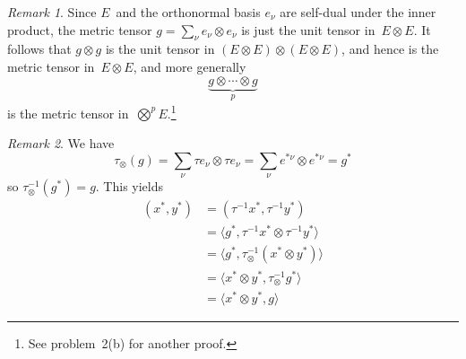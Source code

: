 \documentclass[letterpaper,12pt]{article}
\newcommand{\tprod}{\otimes}
\newcommand{\bigtprod}{\bigotimes}
\newcommand{\medtprod}{{\textstyle\bigtprod}}
\newcommand{\sprod}[2]{\langle#1,#2\rangle}
\newcommand{\iprod}[2]{(#1,#2)}
\theoremstyle{definition}
\theoremstyle{remark}
\newtheorem*{rmk}{Remark}
\begin{document}
\begin{rmk}
Since \(E\)~and the orthonormal basis \(e_{\nu}\) are self-dual under the inner product, the metric tensor \(g=\sum_{\nu}e_{\nu}\tprod e_{\nu}\) is just the unit tensor in~\(E\tprod E\). It follows that \(g\tprod g\) is the unit tensor in \((E\tprod E)\tprod(E\tprod E)\), and hence is the metric tensor in~\(E\tprod E\), and more generally
\[\underbrace{g\tprod\cdots\tprod g}_p\]
is the metric tensor in~\(\medtprod^p E\).\footnote{See problem~2(b) for another proof.}
\end{rmk}

\begin{rmk}
We have
\[\tau_{\tprod}(g)=\sum_{\nu}\tau e_{\nu}\tprod\tau e_{\nu}=\sum_{\nu}e^{*\nu}\tprod e^{*\nu}=g^*\]
so \(\tau_{\tprod}^{-1}(g^*)=g\). This yields
\begin{align*}
\iprod{x^*}{y^*}&=\iprod{\tau^{-1}x^*}{\tau^{-1}y^*}\\
	&=\sprod{g^*}{\tau^{-1}x^*\tprod\tau^{-1}y^*}\\
	&=\sprod{g^*}{\tau_{\tprod}^{-1}(x^*\tprod y^*)}\\
	&=\sprod{x^*\tprod y^*}{\tau_{\tprod}^{-1}g^*}\\
	&=\sprod{x^*\tprod y^*}{g}
\end{align*}
\end{rmk}
\end{document}
